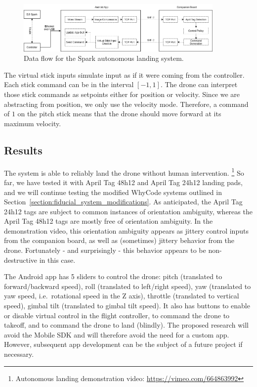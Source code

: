 \begin{figure}[ht]
    \centering
    \includegraphics[width=0.9\textwidth]{images/spark_architecture.drawio}
    \caption{Data flow for the Spark autonomous landing system.}
    \label{figure:spark_architecture}
\end{figure}

The virtual stick inputs simulate input as if it were coming from the controller.
Each stick command can be in the interval $[-1, 1]$.
The drone can interpret those stick commands as setpoints either for position or velocity.
Since we are abstracting from position, we only use the velocity mode.
Therefore, a command of $1$ on the pitch stick
means that the drone should move forward at its maximum velocity.

\subsection{Results}

The system is able to reliably land the drone without human intervention.
\footnote{Autonomous landing demonstration video: \url{https://vimeo.com/664863992}}
So far, we have tested it with April Tag 48h12 and April Tag 24h12 landing pads,
and we will continue testing the modified WhyCode systems outlined in Section~\ref{section:fiducial_system_modifications}.
As anticipated, the April Tag 24h12 tags are subject to common instances of orientation ambiguity,
whereas the April Tag 48h12 tags are mostly free of orientation ambiguity.
In the demonstration video, this orientation ambiguity appears as jittery control inputs from the companion board,
as well as (sometimes) jittery behavior from the drone.
Fortunately - and surprisingly - this behavior appears to be non-destructive in this case.

The Android app has 5 sliders to control the drone:
pitch (translated to forward/backward speed),
roll (translated to left/right speed),
yaw (translated to yaw speed, i.e.~rotational speed in the Z axis),
throttle (translated to vertical speed),
gimbal tilt (translated to gimbal tilt speed).
It also has buttons to enable or disable virtual control in the flight controller,
to command the drone to takeoff,
and to command the drone to land (blindly).
The proposed research will avoid the Mobile SDK and will therefore avoid the need for a custom app.
However, subsequent app development can be the subject of a future project if necessary.

